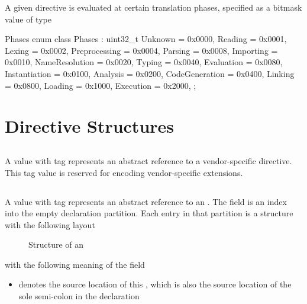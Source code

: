 A given directive is evaluated at certain translation phases, specified as a bitmask value of type
%
\begin{typedef}{Phases}{}
    enum class Phases : uint32_t {
        Unknown         = 0x0000,
        Reading         = 0x0001,
        Lexing          = 0x0002,
        Preprocessing   = 0x0004,
        Parsing         = 0x0008,
        Importing       = 0x0010,
        NameResolution  = 0x0020,
        Typing          = 0x0040,
        Evaluation      = 0x0080,
        Instantiation   = 0x0100,
        Analysis        = 0x0200,
        CodeGeneration  = 0x0400,
        Linking         = 0x0800,
        Loading         = 0x1000,
        Execution       = 0x2000,
    };
\end{typedef}
%

\section{Directive Structures}
\label{sec:ifc-dir-structures}

\subsection{}
\label{sec:ifc:DirSort:VendorExtension}

A  value with tag  represents an abstract reference to a vendor-specific directive.
This tag value is reserved for encoding vendor-specific extensions.
  

\subsection{}
\label{sec:ifc:DirSort:Empty}

A  value with tag  represents an abstract reference to an .
The  field is an index into the empty declaration partition.
Each entry in that partition is a structure with the following layout
%
\begin{figure}[H]
    \centering
    \caption{Structure of an }
    \label{fig:ifc:DirSort:Empty}
\end{figure}
%
with the following meaning of the field
\begin{itemize}
    \item {} denotes the source location of this , which is also the source location of the sole semi-colon in the declaration
\end{itemize}

